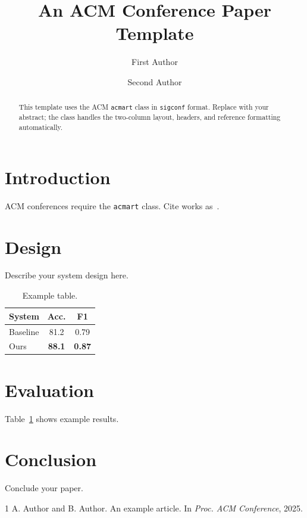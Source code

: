 \documentclass[sigconf,nonacm]{acmart}
\begin{document}
\title{An ACM Conference Paper Template}

\author{First Author}

\author{Second Author}

\begin{abstract}
This template uses the ACM \texttt{acmart} class in \texttt{sigconf}
format. Replace with your abstract; the class handles the two-column
layout, headers, and reference formatting automatically.
\end{abstract}


\maketitle

\section{Introduction}
ACM conferences require the \texttt{acmart} class. Cite works
as~\cite{acm_demo}.

\section{Design}
Describe your system design here.

\begin{table}[h]
  \centering
  \caption{Example table.}
  \label{tab:demo}
  \begin{tabular}{lcc}
    \toprule
    System & Acc. & F1 \\
    \midrule
    Baseline & 81.2 & 0.79 \\
    Ours     & \textbf{88.1} & \textbf{0.87} \\
    \bottomrule
  \end{tabular}
\end{table}

\section{Evaluation}
Table~\ref{tab:demo} shows example results.

\section{Conclusion}
Conclude your paper.

\begin{thebibliography}{1}
A. Author and B. Author.
\newblock An example article.
\newblock In \emph{Proc. ACM Conference}, 2025.
\end{thebibliography}
\end{document}
